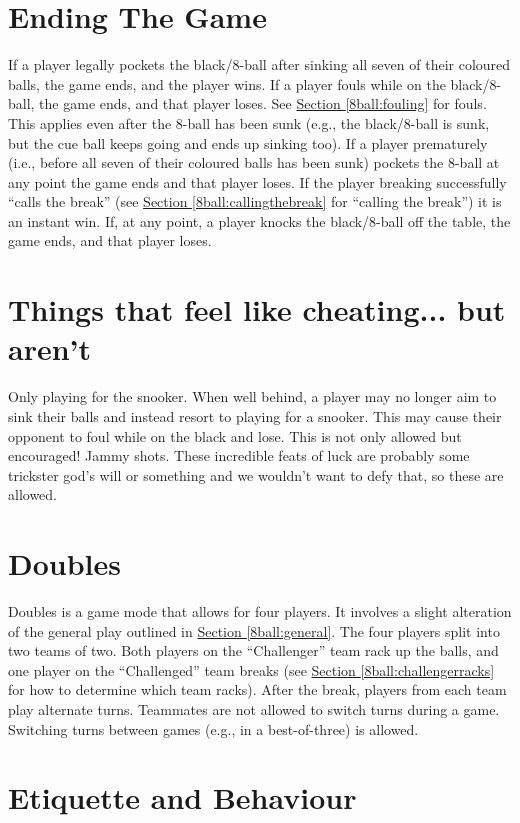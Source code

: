 \section{Ending The Game} \label{8ball:ending}
 If a player legally pockets the black/8-ball after sinking all seven of their coloured balls, the game ends, and the player wins.%
 If a player fouls while on the black/8-ball, the game ends, and that player loses. See \hyperref[8ball:fouling]{Section \ref*{8ball:fouling}} for fouls. This applies even after the 8-ball has been sunk (e.g., the black/8-ball is sunk, but the cue ball keeps going and ends up sinking too).%
 If a player prematurely (i.e., before all seven of their coloured balls has been sunk) pockets the 8-ball at any point the game ends and that player loses.%
 If the player breaking successfully “calls the break” (see \hyperref[8ball:callingthebreak]{Section \ref*{8ball:callingthebreak}} for “calling the break”) it is an instant win.%
 If, at any point, a player knocks the black/8-ball off the table, the game ends, and that player loses.%
 \IntentionalFoulLoss[8ball]%
 \MisleadingOpponentLoss[8ball]%
 \PoorBehaviorLoss[8ball]%

\section{Things that feel like cheating... but aren't} \label{8ball:notcheating}
 Only playing for the snooker. When well behind, a player may no longer aim to sink their balls and instead resort to playing for a snooker. This may cause their opponent to foul while on the black and lose. This is not only allowed but encouraged!%
 Jammy shots. These incredible feats of luck are probably some trickster god's will or something and we wouldn't want to defy that, so these are allowed.%

\section{Doubles} \label{8ball:doubles}
 Doubles is a game mode that allows for four players. It involves a slight alteration of the general play outlined in \hyperref[8ball:general]{Section \ref*{8ball:general}}.%
 The four players split into two teams of two.%
 Both players on the “Challenger” team rack up the balls, and one player on the “Challenged” team breaks (see \hyperref[8ball:challengerracks]{Section \ref*{8ball:challengerracks}} for how to determine which team racks).%
 After the break, players from each team play alternate turns.%
 Teammates are not allowed to switch turns during a game. Switching turns between games (e.g., in a best-of-three) is allowed.%

\section{Etiquette and Behaviour} \label{8ball:etiquette}
\label{8ball:misleading}\Misleading%
 \DistractingWhileSettingUp%
 \DistractingWhileStriking%
\label{8ball:sportsmanship}\Sportsmanship%


